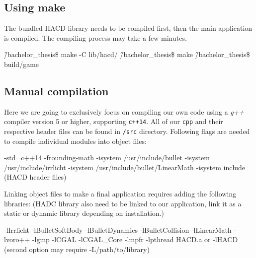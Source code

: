 \subsection*{Using make}
The bundled HACD library needs to be compiled first, then the main application is compiled. The compiling process may take a few minutes.
\begin{code}
\~/bachelor_thesis\$ make -C lib/hacd/
\~/bachelor_thesis\$ make
\~/bachelor_thesis\$ build/game
\end{code}

\subsection*{Manual compilation}
Here we are going to exclusively focus on compiling our own code using a \emph{g++} compiler version 5 or higher, supporting {\tt c++14}. All of our {\tt cpp} and their respective header files can be found in {\tt /src} directory.
Following flags are needed to compile individual modules into object files:
\begin{code}
-std=c++14
-frounding-math
-isystem /usr/include/bullet 
-isystem /usr/include/irrlicht 
-isystem /usr/include/bullet/LinearMath 
-isystem include (HACD header files)
\end{code}

Linking object files to make a final application requires adding the following libraries: (HADC library also need to be linked to our application, link it as a static or dynamic library depending on installation.)
\begin{code}
-lIrrlicht 
-lBulletSoftBody 
-lBulletDynamics 
-lBulletCollision    
-lLinearMath 
-lvoro++ 
-lgmp 
-lCGAL 
-lCGAL_Core 
-lmpfr 
-lpthread
HACD.a or -lHACD (second option may require -L/path/to/library)
\end{code}

